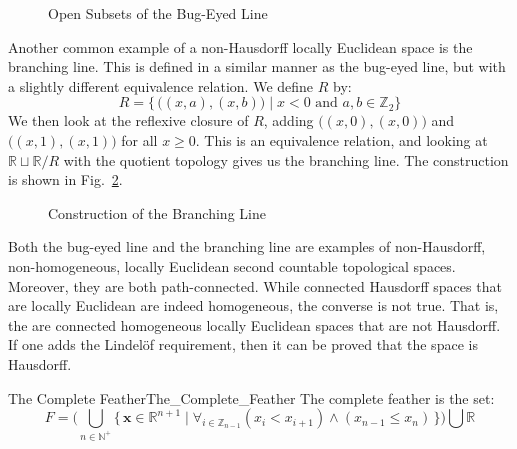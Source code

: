 \documentclass[oneside]{book}                                                  %
\begin{document}
            \begin{figure}[H]
                \centering
                \captionsetup{type=figure}
                
                \caption{Open Subsets of the Bug-Eyed Line}
                \label{fig:Open_Neighborhoods_of_Origins_in_Bug_Eyed_Line}
            \end{figure}
            Another common example of a non-Hausdorff locally Euclidean space is
            the branching line. This is defined in a similar manner as the
            bug-eyed line, but with a slightly different equivalence relation.
            We define $R$ by:
            \begin{equation}
                R=\big\{\,\big((x,a),(x,b)\big)\;|\;
                    x<0\textrm{ and }a,b\in\mathbb{Z}_{2}\big\}
            \end{equation}
            We then look at the reflexive closure of $R$, adding
            $\big((x,0),(x,0)\big)$ and $\big((x,1),(x,1)\big)$ for all
            $x\geq{0}$. This is an equivalence relation, and looking at
            $\mathbb{R}\sqcup\mathbb{R}/R$ with the quotient topology gives us
            the branching line. The construction is shown in
            Fig.~\ref{fig:Construction_of_Branching_Line}.
            \begin{figure}[H]
                \centering
                \captionsetup{type=figure}
                
                \caption{Construction of the Branching Line}
                \label{fig:Construction_of_Branching_Line}
            \end{figure}
            Both the bug-eyed line and the branching line are examples of
            non-Hausdorff, non-homogeneous, locally Euclidean second countable
            topological spaces. Moreover, they are both path-connected. While
            connected Hausdorff spaces that are locally Euclidean are indeed
            homogeneous, the converse is not true. That is, the are connected
            homogeneous locally Euclidean spaces that are not Hausdorff. If one
            adds the Lindel\"{o}f requirement, then it can be proved that the
            space is Hausdorff.
            \begin{fdefinition}{The Complete Feather}{The_Complete_Feather}
                The complete feather is the set:
                \begin{equation*}
                    F=\Big(\bigcup_{n\in\mathbb{N}^{+}}
                        \big\{\,\mathbf{x}\in\mathbb{R}^{n+1}\;|\;
                            \forall_{i\in\mathbb{Z}_{n-1}}(x_{i}<x_{i+1})
                            \land(x_{n-1}\leq{x}_{n})\,\big\}\Big)
                        \bigcup\mathbb{R}
                \end{equation*}
            \end{fdefinition}
\end{document}
